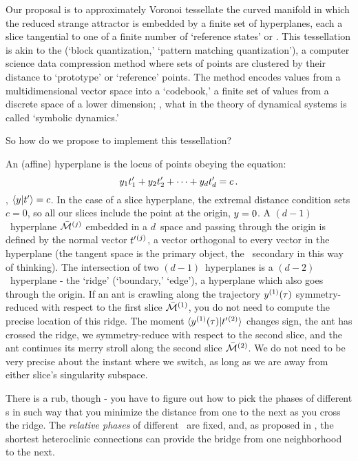 Our proposal is to approximately
 {Voronoi
tessellate}  the curved manifold in which the reduced strange attractor
is embedded by a finite set of hyperplanes, each a slice
tangential to one of a finite number of `reference states' or
{\template}. This tessellation is akin to the
 (`block quantization,'  `pattern matching quantization'),
a computer science data compression method where sets of points are
clustered by their distance to `prototype' or `reference' points. The
method encodes values from a multidimensional vector space into a
`codebook,' a finite set of values from a discrete space of a lower
dimension; \ie, what in the theory of dynamical systems is called
`symbolic dynamics.'

So how do we propose to implement this tessellation?



An (affine) hyperplane is the locus of points obeying the equation:
\[
y_1t'_{1} + y_2t'_{2} + \cdots + y_dt'_{d} = c
\,.
\]
\ie, $\braket{\sspRed}{\sliceTan{}}=c$. In the case of a slice
hyperplane, the extremal distance condition  sets $c=0$,
so all our slices include the point at the origin, $y=0$. A
$(d\!-\!1)$\dmn\ hyperplane $\pSRed{}^{(j)}$ embedded in a
$d$\dmn\ space and passing through the origin is defined by the
normal vector $t'_{}{}^{(j)}$, a vector orthogonal to every vector
in the hyperplane (the tangent space \sliceTan{} is the primary object,
the {\template} \slicep\ secondary in this way of thinking). The
intersection of two $(d\!-\!1)$\dmn\ hyperplanes is a
$(d\!-\!2)$\dmn\ hyperplane - the `ridge' (`boundary,'  `edge'),
a hyperplane which also goes through the origin. If an ant is
crawling along the trajectory $y{}^{(1)}(\tau)$ symmetry-reduced
with respect to the first slice $\pSRed{}^{(1)}$, you do not need to
compute the precise location of this ridge. The moment
$\braket{\sspRed{}^{(1)}(\tau)}{\sliceTan{}{}^{(2)}}$ changes sign, the
ant has crossed the ridge, we symmetry-reduce with respect to the second
slice,
and the ant continues its merry stroll along the second slice
$\pSRed{}^{(2)}$. We
do not need to be very precise about the instant where we switch, as long
as we are away from either slice's singularity subspace.

There is a rub, though - you have to figure out how to pick the phases of
different {\template s} in such way that you
minimize the distance from one to the next as you cross the ridge.
The {\em relative phases} of different \reqva\ are fixed, and, as
proposed in , the shortest heteroclinic connections
can provide the bridge from one neighborhood to the next.

